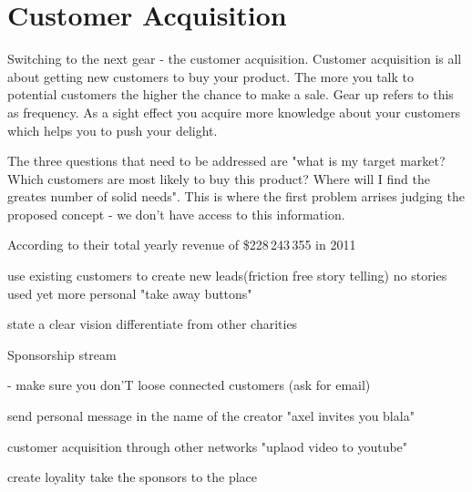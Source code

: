 \section{Customer Acquisition}

Switching to the next gear - the customer acquisition. Customer acquisition is all about getting new customers to buy your product. The more you talk to potential customers the higher the chance to make a sale. Gear up refers to this as frequency. As a sight effect you acquire more knowledge about your customers which helps you to push your delight.

The three questions that need to be addressed are "what is my target market? Which customers are most likely to buy this product? Where will I find the greates number of solid needs". This is where the first problem arrises judging the proposed concept - we don't have access to this information. 

According to their total yearly revenue of  \$228\,243\,355 in 2011  


use existing customers to create new leads(friction free story telling)
no stories used yet
more personal
"take away buttons"

state a clear vision
differentiate from other charities




Sponsorship stream 

- make sure you don'T loose connected customers (ask for email)


send personal message in the name of the creator "axel invites you blala"

customer acquisition through other networks "uplaod video to youtube"

create loyality
take the sponsors to the place


